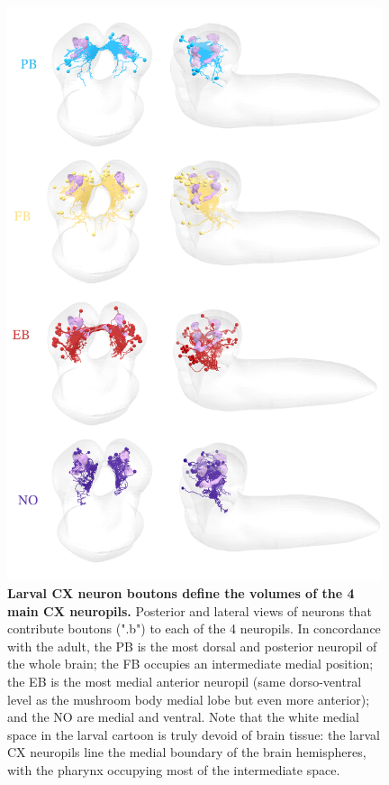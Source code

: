         \begin{figure}
            \centering
            \includegraphics[width=11cm]{Figs/CX/CATMAIDCXneurons.pdf}
            \caption[Larval CX neuron boutons define the volumes of the 4 main CX neuropils]{\textbf{Larval CX neuron boutons define the volumes of the 4 main CX neuropils.} Posterior and lateral views of neurons that contribute boutons (".b") to each of the 4 neuropils. In concordance with the adult, the PB is the most dorsal and posterior neuropil of the whole brain; the FB occupies an intermediate medial position; the EB is the most medial anterior neuropil (same dorso-ventral level as the mushroom body medial lobe but even more anterior); and the NO are medial and ventral. Note that the white medial space in the larval cartoon is truly devoid of brain tissue: the larval CX neuropils line the medial boundary of the brain hemispheres, with the pharynx occupying most of the intermediate space.
            }
            \label{cxneuropils}
        \end{figure}    

